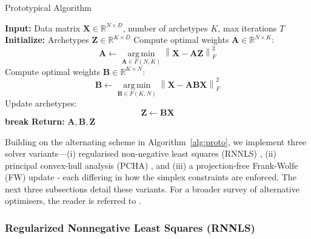 \documentclass[oneside]{article}
\begin{document}
\begin{algorithm}[H]
    \caption{Prototypical Algorithm}
    \label{alg:proto}
    \begin{algorithmic}[1]
    \State \textbf{Input:} Data matrix $\mathbf{X} \in \mathbb{R}^{N \times D}$, number of archetypes $K$, max iterations $T$
    \State \textbf{Initialize:} Archetypes $\mathbf{Z} \in \mathbb{R}^{K \times D}$
        \State Compute optimal weights $\mathbf{A} \in \mathbb{R}^{N \times K}$: \label{proto:computeA}
        \begin{equation}
        \mathbf{A} \gets \operatorname*{arg\,min}_{\mathbf{A} \in F(N, K)} \left\| \mathbf{X} - \mathbf{A} \mathbf{Z} \right\|_F^2
        \end{equation}
        \State Compute optimal weights $\mathbf{B} \in \mathbb{R}^{K \times N}$: \label{proto:computeB}
        \begin{equation}
        \mathbf{B} \gets \operatorname*{arg\,min}_{\mathbf{B} \in F(K, N)} \left\| \mathbf{X} - \mathbf{A} \mathbf{B} \mathbf{X} \right\|_F^2
        \end{equation}
        \State Update archetypes:
        \begin{equation}
        \mathbf{Z} \gets \mathbf{B} \mathbf{X}
        \end{equation}
         \label{proto:convergence}
            \State \textbf{break}
        \EndIf
    \EndFor
    \State \textbf{Return:} $\mathbf{A}, \mathbf{B}, \mathbf{Z}$
    \end{algorithmic}
\end{algorithm}

Building on the alternating scheme in Algorithm~\ref{alg:proto}, we implement three solver variants—(i) regularised non-negative least squares (RNNLS) \autocite{cutlerArchetypalAnalysis1994}, (ii) principal convex-hull analysis (PCHA) \autocite{morupArchetypalAnalysisMachine2012}, and (iii) a projection-free Frank-Wolfe (FW) update \autocite{bauckhageArchetypalAnalysisAutoencoder2015} - each differing in how the simplex constraints are enforced. The next three subsections detail these variants.  For a broader survey of alternative optimisers, the reader is referred to \textcite{alcacerSurveyArchetypalAnalysis2025}.

\subsubsection{Regularized Nonnegative Least Squares (RNNLS)}
\end{document}
